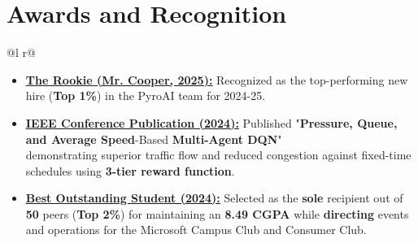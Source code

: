 \documentclass[a4paper,10pt]{article}
\begin{document}
    \section{Awards and Recognition}
    \begin{tabularx}{\linewidth}{ @{}l r@{} }
    \begin{minipage}[t]{\linewidth}
        \begin{itemize}[nosep,after=\strut, leftmargin=2em, itemsep=2pt]
            \item \underline{\href{https://www.linkedin.com/posts/namasivaayam-l-42bb601b1_grateful-to-have-received-the-rookie-award-ugcPost-7352908539742334977-V1qR?utm_source=share&utm_medium=member_desktop&rcm=ACoAADF4fGMBXJGQpy5bTndFTVLu-v3xtfng2iI}{\textbf{The Rookie (Mr. Cooper, 2025):}}} Recognized as the top-performing new hire (\textbf{Top 1\%}) in the PyroAI team for 2024-25.
            \item \underline{\href{https://ieeexplore.ieee.org/document/10533624}{\textbf{IEEE Conference Publication (2024):}}} Published "\textbf{Pressure, Queue, and Average Speed}-Based \textbf{Multi-Agent DQN}" \\[2pt] demonstrating superior traffic flow and reduced congestion against fixed-time schedules using \textbf{3-tier reward function}.
            \item \underline{\href{https://www.linkedin.com/posts/namasivaayam-l-42bb601b1_bestoutstandingstudent-collegeday-mepcoschlenkengineeringcollege-activity-7206211057726484480-iQZ6?utm_source=share&utm_medium=member_desktop&rcm=ACoAADF4fGMBXJGQpy5bTndFTVLu-v3xtfng2iI}{\textbf{Best Outstanding Student (2024):}}} Selected as the \textbf{sole} recipient out of \textbf{50} peers (\textbf{Top 2\%}) for maintaining an \textbf{8.49 CGPA} while \textbf{directing} events and operations for the Microsoft Campus Club and Consumer Club.
        \end{itemize}
    \end{minipage}
    \end{tabularx}  
    
    
\end{document}
